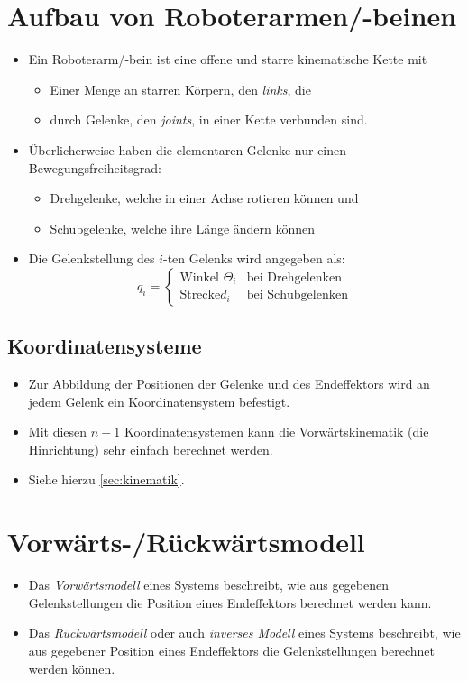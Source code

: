 	\section{Aufbau von Roboterarmen/-beinen} %
		\begin{itemize}
			\item Ein Roboterarm/-bein ist eine offene und starre kinematische Kette mit
				\begin{itemize}
					\item Einer Menge an starren Körpern, den \textit{links}, die
					\item durch Gelenke, den \textit{joints}, in einer Kette verbunden sind.
				\end{itemize}
			\item Überlicherweise haben die elementaren Gelenke nur einen Bewegungsfreiheitsgrad:
				\begin{itemize}
					\item Drehgelenke, welche in einer Achse rotieren können und
					\item Schubgelenke, welche ihre Länge ändern können
				\end{itemize}
			\item Die Gelenkstellung des \(i\)-ten Gelenks wird angegeben als:
				\begin{equation*}
					q _ i =
					\begin{cases}
						\text{Winkel } \Theta _ i & \text{bei Drehgelenken}  \\
						\text{Strecke} d _ i      & \text{bei Schubgelenken}
					\end{cases}
				\end{equation*}
		\end{itemize}

		\subsection{Koordinatensysteme} %
			\begin{itemize}
				\item Zur Abbildung der Positionen der Gelenke und des Endeffektors wird an jedem Gelenk ein Koordinatensystem befestigt.
				\item Mit diesen \( n + 1 \) Koordinatensystemen kann die Vorwärtskinematik (die Hinrichtung) sehr einfach berechnet werden.
				\item Siehe hierzu \ref{sec:kinematik}.
			\end{itemize}

	\section{Vorwärts-/Rückwärtsmodell} %
		\begin{itemize}
			\item Das \textit{Vorwärtsmodell} eines Systems beschreibt, wie aus gegebenen Gelenkstellungen die Position eines Endeffektors berechnet werden kann.
			\item Das \textit{Rückwärtsmodell} oder auch \textit{inverses Modell} eines Systems beschreibt, wie aus gegebener Position eines Endeffektors die Gelenkstellungen berechnet werden können.
		\end{itemize}

